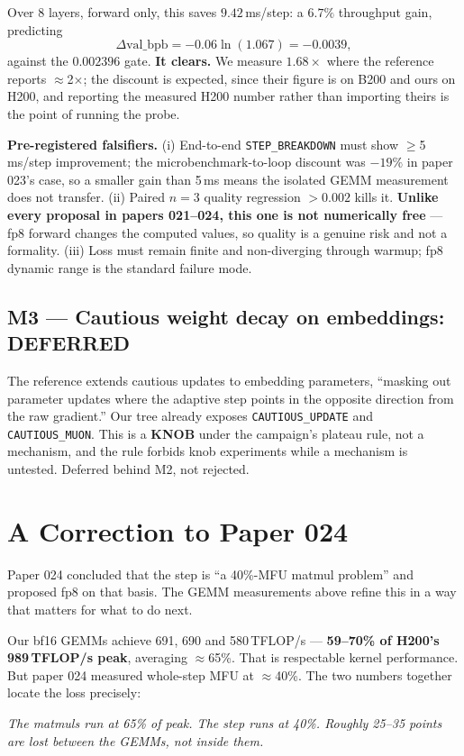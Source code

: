 \documentclass{article}
\newcommand{\vb}{\mathrm{val\_bpb}}
\begin{document}
Over 8 layers, forward only, this saves $9.42$\,ms/step: a $6.7\%$ throughput gain, predicting
\[
\Delta\vb = -0.06\ln(1.067) = \mathbf{-0.0039},
\]
against the $0.002396$ gate. \textbf{It clears.} We measure $1.68\times$ where the reference reports $\approx$2$\times$; the discount is expected, since their figure is on B200 and ours on H200, and reporting the measured H200 number rather than importing theirs is the point of running the probe.

\textbf{Pre-registered falsifiers.} (i) End-to-end \texttt{STEP\_BREAKDOWN} must show $\ge$5\,ms/step improvement; the microbenchmark-to-loop discount was $-19\%$ in paper 023's case, so a smaller gain than 5\,ms means the isolated GEMM measurement does not transfer. (ii) Paired $n{=}3$ quality regression $>0.002$ kills it. \textbf{Unlike every proposal in papers 021--024, this one is not numerically free} --- fp8 forward changes the computed values, so quality is a genuine risk and not a formality. (iii) Loss must remain finite and non-diverging through warmup; fp8 dynamic range is the standard failure mode.

\subsection{M3 --- Cautious weight decay on embeddings: DEFERRED}
The reference extends cautious updates to embedding parameters, ``masking out parameter updates where the adaptive step points in the opposite direction from the raw gradient.'' Our tree already exposes \texttt{CAUTIOUS\_UPDATE} and \texttt{CAUTIOUS\_MUON}. This is a \textbf{KNOB} under the campaign's plateau rule, not a mechanism, and the rule forbids knob experiments while a mechanism is untested. Deferred behind M2, not rejected.

\section{A Correction to Paper 024}
Paper 024 concluded that the step is ``a 40\%-MFU matmul problem'' and proposed fp8 on that basis. The GEMM measurements above refine this in a way that matters for what to do next.

Our bf16 GEMMs achieve 691, 690 and 580\,TFLOP/s --- \textbf{59--70\% of H200's 989\,TFLOP/s peak}, averaging $\approx$65\%. That is respectable kernel performance. But paper 024 measured whole-step MFU at $\approx$40\%. The two numbers together locate the loss precisely:

\begin{center}
\emph{The matmuls run at 65\% of peak. The step runs at 40\%. Roughly 25--35 points are lost between the GEMMs, not inside them.}
\end{center}
\end{document}
